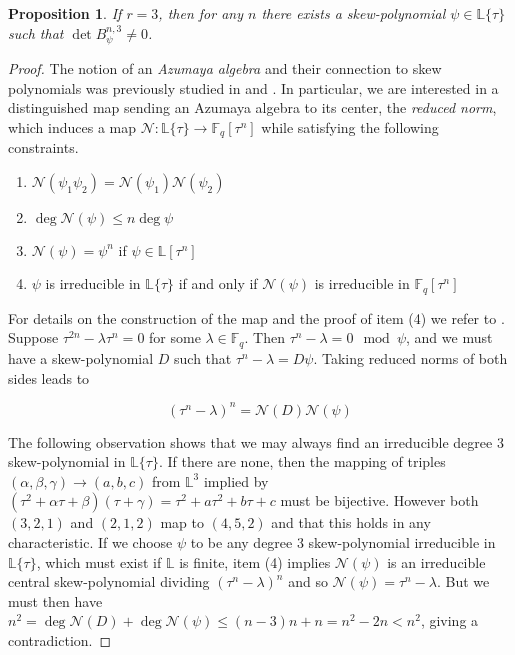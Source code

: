 \documentclass[sigconf]{acmart}
\newtheorem{prop}{Proposition}
\newcommand{\F}{\mathbb{F}}
\renewcommand{\L}{\mathbb{L}}
\newcommand{\cN}{\mathcal{N}}
\newcommand{\sring}{\L\{\tau\}}
\newcommand{\comm}{\mathbb{F}_q[\tau^n]}
\begin{document}
\begin{prop}
If $r = 3$, then for any $n$ there exists a skew-polynomial $\psi \in \L\{\tau\}$ such that $\det B^{n,3}_{\psi} \neq 0$.
\end{prop}
\begin{proof}
The notion of an \textit{Azumaya algebra} and their connection to skew polynomials was previously studied in \cite{Ikehata1984AzumayaAA} and \cite{skewfactor}. In particular, we are interested in a distinguished map sending an Azumaya algebra to its center, the \textit{reduced norm}, which induces a map $\cN: \L\{\tau\} \to \comm$ while satisfying the following constraints.

\begin{enumerate}
    \item $\cN(\psi_1 \psi_2) = \cN(\psi_1) \cN(\psi_2)$
    \item $\deg \cN(\psi) \leq n \deg \psi$
    \item $\cN(\psi) = \psi^n$ if $\psi \in \L[\tau^n]$
    \item $\psi$ is irreducible in $\sring$ if and only if $\cN(\psi)$ is irreducible in $\F_q[\tau^n]$
\end{enumerate}

For details on the construction of the map and the proof of item (4) we refer to \cite{skewfactor}. Suppose $\tau^{2n} - \lambda \tau^n = 0$ for some $\lambda \in \F_q$. Then $\tau^{n} - \lambda = 0 \mod \psi$, and we must have a skew-polynomial $D$ such that $\tau^n - \lambda = D \psi$. Taking reduced norms of both sides leads to

\begin{equation*}
(\tau^n - \lambda)^n = \cN(D)\cN(\psi)
\end{equation*}

The following observation shows that we may always find an irreducible degree 3 skew-polynomial in $\L\{\tau\}$. If there are none, then the mapping of triples $(\alpha, \beta, \gamma) \to (a, b, c)$ from $\L^3$ implied by $(\tau^2 + \alpha \tau + \beta)(\tau + \gamma) = \tau^2 + a \tau^2 + b\tau + c$ must be bijective. However both $(3, 2, 1)$ and $(2, 1, 2)$ map to $(4, 5, 2)$ and that this holds in any characteristic.  If we choose $\psi$ to be any degree 3 skew-polynomial irreducible in $\L\{\tau \}$, which must exist if $\L$ is finite, item (4) implies $\cN(\psi)$ is an irreducible central skew-polynomial dividing $(\tau^n - \lambda)^n$ and so $\cN(\psi) = \tau^n - \lambda$. But we must then have $n^2 = \deg \cN(D) + \deg \cN(\psi) \leq (n-3)n + n = n^2 - 2n < n^2$, giving a contradiction.

\end{proof}
\end{document}
